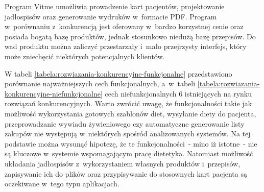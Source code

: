 \begin{itemize}
        Program Vitme\cite{url:vitme} umożliwia prowadzenie kart pacjentów, projektowanie jadłospisów oraz generowanie wydruków w~formacie PDF.
        Program w~porównaniu z~konkurencją jest oferowany w~bardzo korzystnej cenie oraz posiada bogatą bazę produktów, jednak stosunkowo niedużą bazę przepisów.
        Do wad produktu można zaliczyć przestarzały i~mało przejrzysty interfejs, który może zniechęcić niektórych potencjalnych klientów.
%
\end{itemize}

W tabeli \ref{tabela:rozwiazania-konkurencyjne-funkcjonalne} przedstawiono porównanie najważniejszych cech funkcjonalnych,
a~w~tabeli \ref{tabela:rozwiazania-konkurencyjne-niefunkcjonalne} cech niefunkcjonalnych
6 istniejących na rynku rozwiązań konkurencyjnych\cite{url:porownanie-programow-dietetycznych}.
Warto zwrócić uwagę, że funkcjonalności takie jak możliwość wykorzystania gotowych szablonów diet, wysyłanie diety do pacjenta,
przeprowadzanie wywiadu żywieniowego czy automatyczne generowanie listy zakupów nie występują w~niektórych spośród analizowanych systemów.
Na tej podstawie można wysunąć hipotezę, że te funkcjonalności~- mino iż istotne~- nie są kluczowe w~systemie wspomagającym pracę dietetyka.
Natomiast możliwość układania jadłospisów z~wykorzystaniem własnych produktów i~przepisów,
zapisywanie ich do plików oraz przypisywanie do stosownych kart pacjenta są oczekiwane w~tego typu aplikacjach.


